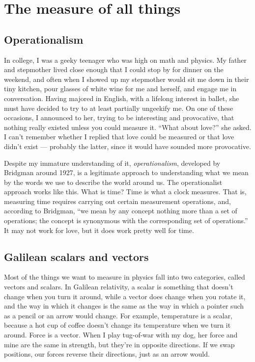 \chapter{The measure of all things}

\section{Operationalism}

In college, I was a geeky teenager who was high on math and physics.
My father and stepmother lived close enough that I could stop by
for dinner on the weekend, and often when I showed up my stepmother
would sit me down in their tiny kitchen, pour  glasses of white wine
for me and herself, and engage me in conversation. Having majored in English,
with a lifelong interest in ballet, she must have
decided to try to at least partially ungeekify me. On one of these occasions,
I announced to her, trying to be interesting and provocative, that
nothing really existed unless you could measure it.
``What about love?'' she asked. I can't remember whether I replied that
love could be measured or that love didn't exist --- probably the latter,
since it would have sounded more provocative.

Despite my immature understanding of it, \emph{operationalism}, developed by Bridgman
around 1927, is a legitimate
approach to understanding what we mean by the words we use to describe the
world around us. The operationalist approach works like this. What is time?
Time is what a clock measures. That is, measuring time requires carrying out
certain measurement operations, and, according to Bridgman,
``we mean by any concept nothing more than a set of operations;
the concept is synonymous with the corresponding set of operations.''
It may not work for love, but it does work pretty well for time.

\section{Galilean scalars and vectors}

Most of the things we want to measure in physics fall into two categories,
called vectors and scalars. In Galilean relativity, a scalar is something
that doesn't change when you turn it around, while a vector does change
when you rotate it, and the way in which it changes is the same as the way
in which a pointer such as a pencil or an arrow would change. For example,
temperature is a scalar, because a hot cup of coffee doesn't change its temperature
when we turn it around. Force is a vector. When I play tug-of-war with my dog,
her force and mine are the same in strength, but they're in opposite directions.
If we swap positions, our forces reverse their directions, just as an arrow would.

